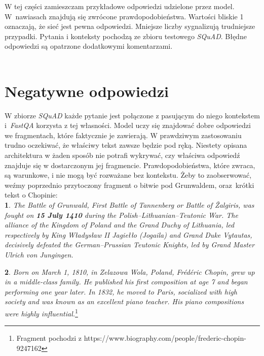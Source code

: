 W tej części zamieszczam przykładowe odpowiedzi udzielone przez model. W~nawiasach znajdują się zwrócone prawdopodobieństwa. Wartości bliskie 1 oznaczają, że sieć jest pewna odpowiedzi. Mniejsze liczby sygnalizują trudniejsze przypadki. Pytania i konteksty pochodzą ze zbioru testowego \textit{SQuAD}. Błędne odpowiedzi są opatrzone dodatkowymi komentarzami.\\\\




\section{Negatywne odpowiedzi} \label{negans}

W zbiorze \textit{SQuAD} każde pytanie jest połączone z pasującym do niego kontekstem i~\textit{FastQA} korzysta z tej własności. Model uczy się znajdować dobre odpowiedzi we fragmentach, które faktycznie je zawierają. W prawdziwym zastosowaniu trudno oczekiwać, że właściwy tekst zawsze będzie pod ręką. Niestety opisana architektura w żaden sposób nie potrafi wykrywać, czy właściwa odpowiedź znajduje się w dostarczonym jej fragmencie. Prawdopodobieństwa, które zwraca, są warunkowe, i nie mogą być rozważane bez kontekstu. Żeby to zaobserwować, weźmy poprzednio przytoczony fragment o bitwie pod Grunwaldem, oraz~krótki tekst o Chopinie:\\

\small
\textbf{1}. \textit{The Battle of Grunwald, First Battle of Tannenberg or Battle of Žalgiris, was fought on \textbf{15 July 1410} during the Polish–Lithuanian–Teutonic War. The alliance of the Kingdom of Poland and the Grand Duchy of Lithuania, led respectively by King Władysław II Jagiełło (Jogaila) and Grand Duke Vytautas, decisively defeated the German–Prussian Teutonic Knights, led by Grand Master Ulrich von Jungingen.\\}

\textbf{2}. \textit{Born on March 1, 1810, in Zelazowa Wola, Poland, Frédéric Chopin, grew up in a middle-class family. He published his first composition at age 7 and began performing one year later. In 1832, he moved to Paris, socialized with high society and was known as an excellent piano teacher. His piano compositions were highly influential.}\footnote{Fragment pochodzi z https://www.biography.com/people/frederic-chopin-9247162}\\

